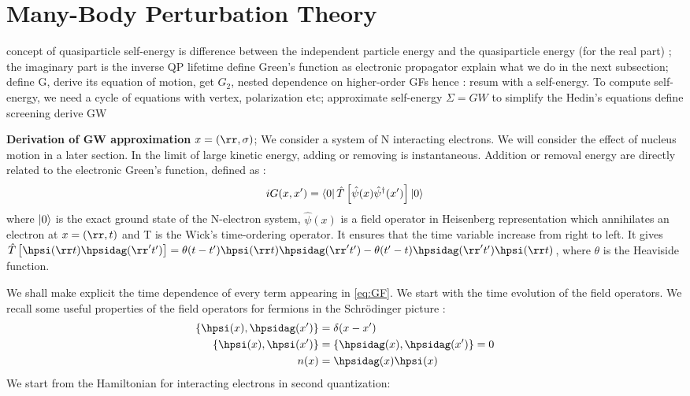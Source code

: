 \section{Many-Body Perturbation Theory}
concept of quasiparticle
self-energy is difference between the independent particle energy and the quasiparticle energy (for the real part) ; the imaginary part is the inverse QP lifetime
define Green's function as electronic propagator
explain what we do in the next subsection; define G, derive its equation of motion, get $G_2$, nested dependence on higher-order GFs hence : resum with a self-energy. To compute self-energy, we need a cycle of equations with vertex, polarization etc; approximate self-energy $\Sigma = GW$ to simplify the Hedin's equations 
define screening
derive GW

\textbf{Derivation of GW approximation}
$x = (\rr,\sigma)$;
We consider a system of N interacting electrons. We will consider the effect of nucleus motion in a later section.
In the limit of large kinetic energy, adding or removing is instantaneous. Addition or removal energy are directly related to the electronic Green's function, defined as :
\begin{equation}
	iG(x,x') = \bra{0} \hat{T} \left[ \hat{\psi}(x)\hat{\psi}^\dagger(x') \right] \ket{0} \label{eq:GF}
\end{equation}
where $\ket{0}$ is the exact ground state of the N-electron system, $\hat{\psi}(x)$ is a field operator in Heisenberg representation which annihilates an electron at $x = (\rr,t)$ and T is the Wick's time-ordering operator. It ensures that the time variable increase from right to left. It gives $\hat{T}\left[ \hpsi(\rr t) \hpsidag(\rr 't') \right] = \theta(t-t') \hpsi(\rr t) \hpsidag(\rr 't') - \theta(t'-t)\hpsidag(\rr't')\hpsi(\rr t)$, where $\theta$ is the Heaviside function.  %

We shall make explicit the time dependence of every term appearing in \ref{eq:GF}. We start with the time evolution of the field operators. We recall some useful properties of the field operators for fermions in the Schrödinger picture :
\begin{align}
\begin{split}
	\{ \hpsi(x),\hpsidag(x')\} &= \delta (x-x') \\
	\{ \hpsi(x),\hpsi(x') \} &= \{ \hpsidag(x),\hpsidag(x') \} = 0 \\
	n(x) &= \hpsidag(x)\hpsi(x)
\end{split}	
\end{align}
We start from the Hamiltonian for interacting electrons in second quantization:


